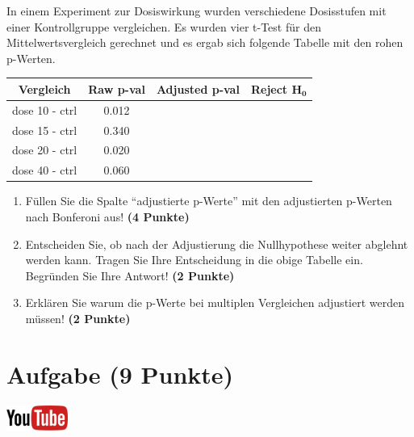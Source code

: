 \documentclass[a4paper, 10pt]{scrartcl}\usepackage[]{graphicx}\usepackage[]{xcolor}
\begin{document}
In einem Experiment zur Dosiswirkung wurden verschiedene Dosisstufen mit
einer Kontrollgruppe vergleichen. Es wurden vier t-Test f{\"u}r den
Mittelwertsvergleich gerechnet und es ergab sich folgende Tabelle mit den
rohen p-Werten.



\begin{center}
  \Large
  \begin{tabular}{c|c|c|c}
    \textbf{Vergleich} & \textbf{Raw p-val} & \textbf{Adjusted p-val} &
                                                                        \textbf{Reject $\boldsymbol{H_0}$} \strut\\
    \hline
    dose 10 - ctrl  & 0.012 &  &\strut\\
    \hline
    dose 15 - ctrl  & 0.340 & &\strut\\
    \hline
    dose 20 - ctrl  & 0.020 & &\strut\\
    \hline
    dose 40 - ctrl  & 0.060 & &\strut\\
  \end{tabular}
\end{center}

\begin{enumerate}
\item F{\"u}llen Sie die Spalte "`adjustierte p-Werte"' mit den adjustierten
  p-Werten nach Bonferoni aus! \textbf{(4 Punkte)}
\item Entscheiden Sie, ob nach der Adjustierung die Nullhypothese weiter
  abglehnt werden kann. Tragen Sie Ihre Entscheidung in die obige Tabelle
  ein. Begr{\"u}nden Sie Ihre Antwort! \textbf{(2 Punkte)}
\item Erkl{\"a}ren Sie warum die p-Werte bei multiplen Vergleichen
  adjustiert werden m{\"u}ssen! \textbf{(2 Punkte)}
\end{enumerate}

\vspace{1Ex}

 
\clearpage

\section{Aufgabe \hfill (9 Punkte)}

 \hfill\href{https://youtu.be/RagTFFKFbFg}{\includegraphics[width =
   2cm]{img/youtube}}\\[1Ex]
\end{document}
